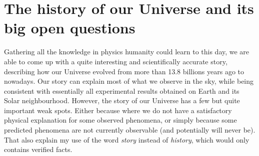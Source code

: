 \chaptertoc{}

\vspace{1em}



\section{The history of our Universe and its big open questions}
\label{intro:history_questions}

    Gathering all the knowledge in physics humanity could learn to this day, 
    we are able to come up with a quite interesting and scientifically accurate story,
    describing how our Universe evolved from more than 13.8 billions years ago to nowadays. 
    Our story can explain most of what we observe in the sky, 
    while being consistent with essentially all experimental results obtained on Earth 
    and its Solar neighbourhood.  
    However, the story of our Universe has a few but quite important weak spots. 
    Either because where we do not have 
    a satisfactory physical explanation for some observed phenomena, 
    or simply because some predicted phenomena are not currently observable
    (and potentially will never be).
    That also explain my use of the word \emph{story} instead of \emph{history}, 
    which would only contains verified facts. 

